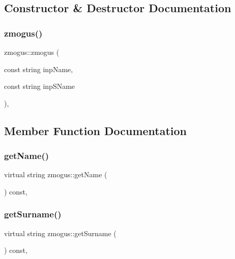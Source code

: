 \subsection{Constructor \& Destructor Documentation}
\mbox{\label{classzmogus_a4ead87c9e0f93b14bfdde10423d967b1}} 
\subsubsection{\texorpdfstring{zmogus()}{zmogus()}}
{\footnotesize\ttfamily zmogus\+::zmogus (\begin{DoxyParamCaption}\item[{const string}]{inp\+Name,  }\item[{const string}]{inp\+S\+Name }\end{DoxyParamCaption})\hspace{0.3cm}{\ttfamily [inline]}, {\ttfamily [protected]}}



\subsection{Member Function Documentation}
\mbox{\label{classzmogus_ae9aa17e5d064dcf342e4115d7b58fc22}} 
\subsubsection{\texorpdfstring{getName()}{getName()}}
{\footnotesize\ttfamily virtual string zmogus\+::get\+Name (\begin{DoxyParamCaption}{ }\end{DoxyParamCaption}) const\hspace{0.3cm}{\ttfamily [inline]}, {\ttfamily [virtual]}}

\mbox{\label{classzmogus_ae6be958db4c6c28ab58f29fbe28d0048}} 
\subsubsection{\texorpdfstring{getSurname()}{getSurname()}}
{\footnotesize\ttfamily virtual string zmogus\+::get\+Surname (\begin{DoxyParamCaption}{ }\end{DoxyParamCaption}) const\hspace{0.3cm}{\ttfamily [inline]}, {\ttfamily [virtual]}}

